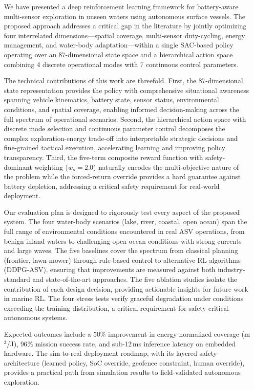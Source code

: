 \documentclass[conference]{IEEEtran}
\begin{document}
We have presented a deep reinforcement learning framework for battery-aware multi-sensor exploration in unseen waters using autonomous surface vessels. The proposed approach addresses a critical gap in the literature by jointly optimizing four interrelated dimensions---spatial coverage, multi-sensor duty-cycling, energy management, and water-body adaptation---within a single SAC-based policy operating over an 87-dimensional state space and a hierarchical action space combining 4 discrete operational modes with 7 continuous control parameters.

The technical contributions of this work are threefold. First, the 87-dimensional state representation provides the policy with comprehensive situational awareness spanning vehicle kinematics, battery state, sensor status, environmental conditions, and spatial coverage, enabling informed decision-making across the full spectrum of operational scenarios. Second, the hierarchical action space with discrete mode selection and continuous parameter control decomposes the complex exploration-energy trade-off into interpretable strategic decisions and fine-grained tactical execution, accelerating learning and improving policy transparency. Third, the five-term composite reward function with safety-dominant weighting ($w_s = 2.0$) naturally encodes the multi-objective nature of the problem while the forced-return override provides a hard guarantee against battery depletion, addressing a critical safety requirement for real-world deployment.

Our evaluation plan is designed to rigorously test every aspect of the proposed system. The four water-body scenarios (lake, river, coastal, open ocean) span the full range of environmental conditions encountered in real ASV operations, from benign inland waters to challenging open-ocean conditions with strong currents and large waves. The five baselines cover the spectrum from classical planning (frontier, lawn-mower) through rule-based control to alternative RL algorithms (DDPG-ASV), ensuring that improvements are measured against both industry-standard and state-of-the-art approaches. The five ablation studies isolate the contribution of each design decision, providing actionable insights for future work in marine RL. The four stress tests verify graceful degradation under conditions exceeding the training distribution, a critical requirement for safety-critical autonomous systems.

Expected outcomes include a 50\% improvement in energy-normalized coverage (m$^2$/J), 96\% mission success rate, and sub-12\,ms inference latency on embedded hardware. The sim-to-real deployment roadmap, with its layered safety architecture (learned policy, SoC override, geofence constraint, human override), provides a practical path from simulation results to field-validated autonomous exploration.
\end{document}
